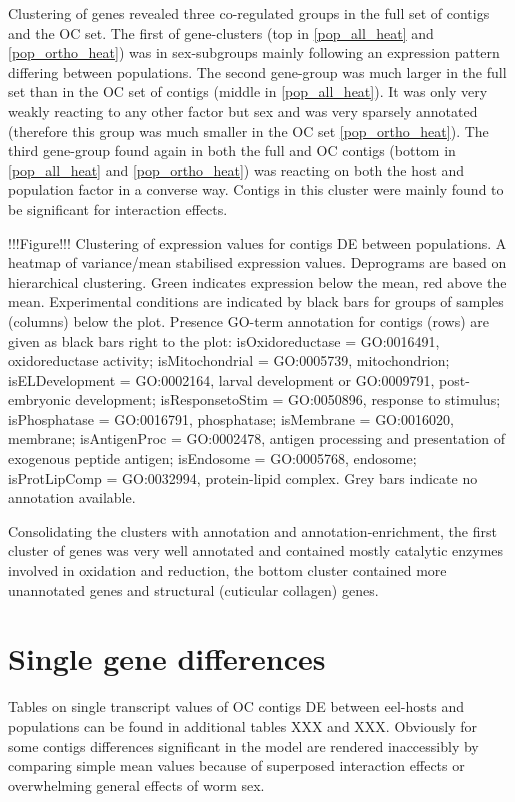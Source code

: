 \documentclass[10pt]{article}
\begin{document}
Clustering of genes revealed three co-regulated groups in the full set
of contigs and the OC set. The first of gene-clusters (top in
\ref{pop_all_heat} and \ref{pop_ortho_heat}) was in sex-subgroups
mainly following an expression pattern differing between
populations. The second gene-group was much larger in the full set
than in the OC set of contigs (middle in \ref{pop_all_heat}). It was
only very weakly reacting to any other factor but sex and was very
sparsely annotated (therefore this group was much smaller in the OC
set \ref{pop_ortho_heat}). The third gene-group found again in both
the full and OC contigs (bottom in \ref{pop_all_heat} and
\ref{pop_ortho_heat}) was reacting on both the host and population
factor in a converse way. Contigs in this cluster were mainly found to
be significant for interaction effects.

!!!Figure!!! Clustering of expression values for contigs DE between
populations. A heatmap of variance/mean stabilised expression
values. Deprograms are based on hierarchical clustering. Green
indicates expression below the mean, red above the mean. Experimental
conditions are indicated by black bars for groups of samples (columns)
below the plot. Presence GO-term annotation for contigs (rows) are
given as black bars right to the plot: isOxidoreductase = GO:0016491,
oxidoreductase activity; isMitochondrial = GO:0005739, mitochondrion;
isELDevelopment = GO:0002164, larval development or GO:0009791,
post-embryonic development; isResponsetoStim = GO:0050896, response to
stimulus; isPhosphatase = GO:0016791, phosphatase; isMembrane =
GO:0016020, membrane; isAntigenProc = GO:0002478, antigen processing
and presentation of exogenous peptide antigen; isEndosome =
GO:0005768, endosome; isProtLipComp = GO:0032994, protein-lipid
complex. Grey bars indicate no annotation available.

Consolidating the clusters with annotation and annotation-enrichment,
the first cluster of genes was very well annotated and contained
mostly catalytic enzymes involved in oxidation and reduction, the
bottom cluster contained more unannotated genes and structural
(cuticular collagen) genes.

\section{Single gene differences}
\label{sec:single-gene-diff}

Tables on single transcript values of OC contigs DE between eel-hosts
and populations can be found in additional tables XXX and
XXX. Obviously for some contigs differences significant in the model
are rendered inaccessibly by comparing simple mean values because of
superposed interaction effects or overwhelming general effects of worm
sex.
\end{document}
